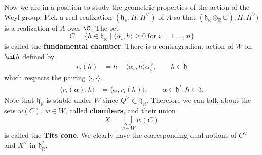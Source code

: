 \documentclass[12pt]{article}
\begin{document}
Now we are in a position to study the geometric properties of the action of the Weyl group.
Pick a real realization $(\mathfrak{h}_{\mathbb{R}},\Pi, \Pi^\vee)$ of $A$ so that $(\mathfrak{h}_{\mathbb{R}} \otimes_{\mathbb{R}} \mathbb{C}), \Pi, \Pi^\vee)$ is a realization of $A$ over $\C$.
The set
\[
    C = \{ h \in \mathfrak{h}_{\mathbb{R}} \mid \langle \alpha_i,h \rangle \geq 0
    \ \text{for } i=1,\dots,n \}
\]
is called the \textbf{fundamental chamber}. There is a contragradient action of $W$ on $\mf h$ defined by \begin{align*}
    r_i(h) & = h - \langle \alpha_i,h \rangle \alpha_i^\vee, \qquad h \in \mathfrak{h}
\end{align*} which respects the pairing $\langle \cdot, \cdot \rangle$. \begin{align*}
    \langle r_i(\alpha), h \rangle & = \langle \alpha, r_i(h) \rangle, \qquad \alpha \in \mathfrak{h}^*, h \in \mathfrak{h}.
\end{align*} Note that $\mathfrak{h}_{\mathbb{R}}$ is stable under $W$ since $Q^\vee \subset \mathfrak{h}_{\mathbb{R}}$. Therefore we can talk about the sets $w(C)$, $w\in W$, called \textbf{chambers}, and their union
\[
    X = \bigcup_{w\in W} w(C)
\]
is called the \textbf{Tits cone}. We clearly have the corresponding dual notions of $C^\vee$ and $X^\vee$ in $\mathfrak{h}_{\mathbb{R}}^*$.
\end{document}
